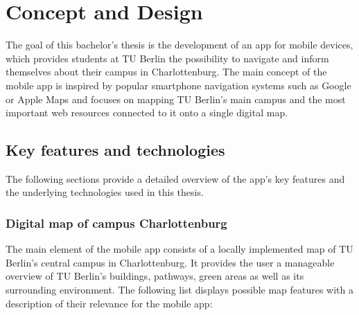 \chapter{Concept and Design}
\label{cha:conceptanddesign}
The goal of this bachelor's thesis is the development of an app for mobile devices, which provides students at TU Berlin the possibility to navigate and inform themselves about their campus in Charlottenburg. The main concept of the mobile app is inspired by popular smartphone navigation systems such as Google or Apple Maps and focuses on mapping TU Berlin's main campus and the most important web resources connected to it onto a single digital map.

\section{Key features and technologies}
The following sections provide a detailed overview of the app's key features and the underlying technologies used in this thesis.

\subsection{Digital map of campus Charlottenburg} \label{campus_map_1}
The main element of the mobile app consists of a locally implemented map of TU Berlin's central campus in Charlottenburg. It provides the user a manageable overview of TU Berlin's buildings, pathways, green areas as well as its surrounding environment. The following list displays possible map features with a description of their relevance for the mobile app:\\


